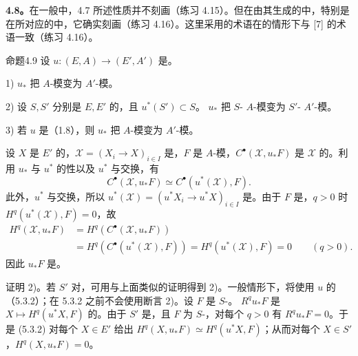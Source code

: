 \textbf{4.8。}在一般中，4.7 所述性质并不刻画（练习 4.15）。但在由其生成的中，特别是在所对应的中，它确实刻画（练习 4.16）。这里采用的术语在的情形下与 [7] 的术语一致（练习 4.16）。
\begin{SGAresult}{命题}{4.9}
设 $u:(E,A)\to(E',A')$ 是。

1)  $u_*$ 把 $A$-模变为 $A'$-模。

2) 设 $S,S'$ 分别是 $E,E'$ 的，且 $u^*(S')\subset S$。 $u_*$ 把 $S$- $A$-模变为 $S'$- $A'$-模。

3) 若 $u$ 是（1.8），则 $u_*$ 把 $A$-模变为 $A'$-模。
\end{SGAresult}
设 $X$ 是 $E'$ 的，$\mathcal X=(X_i\to X)_{i\in I}$ 是，$F$ 是 $A$-模，$C^\bullet(\mathcal X,u_*F)$ 是 $\mathcal X$ 的。利用 $u_*$ 与 $u^*$ 的性以及 $u^*$ 与交换，有
\[
 C^\bullet(\mathcal X,u_*F)\simeq C^\bullet(u^*(\mathcal X),F).
\]
此外，$u^*$ 与交换，所以 $u^*(\mathcal X)=(u^*X_i\to u^*X)_{i\in I}$ 是。由于 $F$ 是，$q>0$ 时 $H^q(u^*(\mathcal X),F)=0$，故
\[
\begin{split}
 H^q(\mathcal X,u_*F)&=H^q(C^\bullet(\mathcal X,u_*F))\\
 &=H^q(C^\bullet(u^*(\mathcal X),F))=H^q(u^*(\mathcal X),F)=0
 \qquad(q>0).
\end{split}
\]
因此 $u_*F$ 是。

证明 2)。若 $S'$ 对，可用与上面类似的证明得到 2)。一般情形下，将使用 $u$ 的（5.3.2）；在 5.3.2 之前不会使用断言 2)。设 $F$ 是 $S$-。 $R^qu_*F$ 是 $X\mapsto H^q(u^*X,F)$ 的。由于 $S'$ 是，且 $F$ 为 $S$-，对每个 $q>0$ 有 $R^qu_*F=0$。于是 (5.3.2) 对每个 $X\in E'$ 给出 $H^q(X,u_*F)\simeq H^q(u^*X,F)$；从而对每个 $X\in S'$，$H^q(X,u_*F)=0$。


